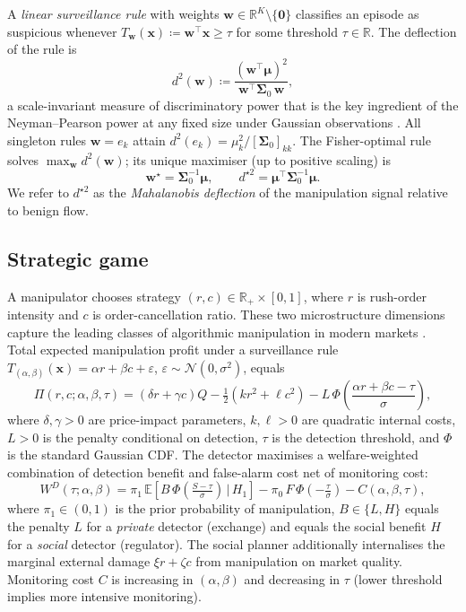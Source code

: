 \documentclass[11pt,a4paper]{article}
\theoremstyle{definition}
\theoremstyle{remark}
\newcommand{\E}{\mathbb{E}}
\newcommand{\R}{\mathbb{R}}
\newcommand{\1}{\mathbf{1}}
\newcommand{\w}{\mathbf{w}}
\newcommand{\x}{\mathbf{x}}
\newcommand{\mmu}{\boldsymbol{\mu}}
\newcommand{\Sig}{\boldsymbol{\Sigma}}
\newcommand{\trans}{^{\!\top}}
\newcommand{\defeq}{\coloneqq}
\begin{document}
A \emph{linear surveillance rule} with weights $\w\in\R^K\setminus\{\mathbf{0}\}$ classifies an episode as suspicious whenever $T_\w(\x)\defeq\w\trans\x \ge \tau$ for some threshold $\tau\in\R$. The deflection of the rule is
\begin{equation}
d^2(\w)\defeq\frac{(\w\trans\mmu)^2}{\w\trans\Sig_0\,\w},
\label{eq:def}
\end{equation}
a scale-invariant measure of discriminatory power that is the key ingredient of the Neyman--Pearson power at any fixed size under Gaussian observations \citep{kay1998fundamentals,poor1994introduction}. All singleton rules $\w=e_k$ attain $d^2(e_k)=\mu_k^2/[\Sig_0]_{kk}$. The Fisher-optimal rule solves $\max_\w d^2(\w)$; its unique maximiser (up to positive scaling) is
\begin{equation}
\w^\star = \Sig_0^{-1}\mmu, \qquad d^{\star 2} = \mmu\trans \Sig_0^{-1}\mmu.
\label{eq:fisher}
\end{equation}
We refer to $d^{\star 2}$ as the \emph{Mahalanobis deflection} of the manipulation signal relative to benign flow.

\subsection{Strategic game}
A manipulator chooses strategy $(r,c)\in\R_+\times[0,1]$, where $r$ is rush-order intensity and $c$ is order-cancellation ratio. These two microstructure dimensions capture the leading classes of algorithmic manipulation in modern markets \citep{khomyn2021algos,dhawan2021new}. Total expected manipulation profit under a surveillance rule $T_{(\alpha,\beta)}(\x)=\alpha r + \beta c + \varepsilon$, $\varepsilon\sim\mathcal{N}(0,\sigma^2)$, equals
\begin{equation}
\Pi(r,c;\alpha,\beta,\tau)=(\delta r + \gamma c)Q - \tfrac{1}{2}(kr^2 + \ell c^2) - L\,\Phi\!\left(\frac{\alpha r + \beta c - \tau}{\sigma}\right),
\label{eq:profit}
\end{equation}
where $\delta,\gamma>0$ are price-impact parameters, $k,\ell>0$ are quadratic internal costs, $L>0$ is the penalty conditional on detection, $\tau$ is the detection threshold, and $\Phi$ is the standard Gaussian CDF. The detector maximises a welfare-weighted combination of detection benefit and false-alarm cost net of monitoring cost:
\begin{equation}
W^D(\tau;\alpha,\beta)=\pi_1\,\E\!\left[B\,\Phi\!\left(\tfrac{S-\tau}{\sigma}\right)\,\Big|\,H_1\right] - \pi_0\,F\,\Phi\!\left(-\tfrac{\tau}{\sigma}\right) - C(\alpha,\beta,\tau),
\label{eq:welfare}
\end{equation}
where $\pi_1\in(0,1)$ is the prior probability of manipulation, $B\in\{L, H\}$ equals the penalty $L$ for a \emph{private} detector (exchange) and equals the social benefit $H$ for a \emph{social} detector (regulator). The social planner additionally internalises the marginal external damage $\xi r + \zeta c$ from manipulation on market quality. Monitoring cost $C$ is increasing in $(\alpha,\beta)$ and decreasing in $\tau$ (lower threshold implies more intensive monitoring).
\end{document}
